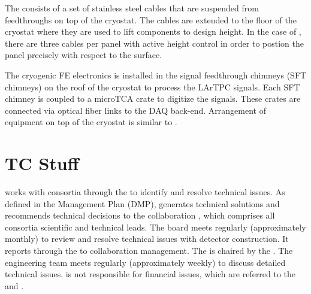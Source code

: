 The   consists of a set of stainless steel
cables that are suspended from feedthroughs on top of the
cryostat. The cables are extended to the floor of the cryostat where
they are used to lift components to design height. In the case of
, there are three cables per panel with active height
control in order to postion the panel precisely with respect to the
 surface.

The cryogenic FE electronics is installed in the signal feedthrough
chimneys (SFT chimneys) on the roof of the cryostat to process the
LArTPC signals. Each SFT chimney is coupled to a microTCA crate to
digitize the signals. These crates are connected via optical fiber links to the DAQ
back-end. Arrangement of equipment on top of the cryostat is similar to . 

\section{TC Stuff}

 works with consortia through the  to identify and
resolve technical issues.  As defined in the  Management
Plan (DMP),   generates technical solutions and
recommends technical decisions to the  collaboration
, which comprises all consortia scientific and technical
leads. The board meets regularly (approximately monthly) to review and
resolve technical issues with detector construction. It reports
through the  to collaboration management. The 
 is chaired by the  . The
 engineering team meets regularly (approximately weekly) to
discuss detailed technical issues.   is not responsible for
financial issues, which are referred to the  and
.

